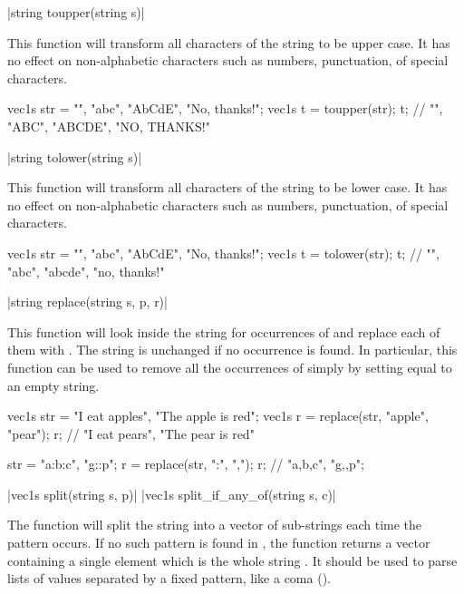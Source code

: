 \funcitem \vectorfunc \cppinline|string toupper(string s)| 

This function will transform all characters of the string to be upper case. It has no effect on non-alphabetic characters such as numbers, punctuation, of special characters.

\begin{example}
\begin{cppcode}
vec1s str = {"", "abc", "AbCdE", "No, thanks!"};
vec1s t = toupper(str);
t; // {"", "ABC", "ABCDE", "NO, THANKS!"}
\end{cppcode}
\end{example}

\funcitem \vectorfunc \cppinline|string tolower(string s)| 

This function will transform all characters of the string to be lower case. It has no effect on non-alphabetic characters such as numbers, punctuation, of special characters.

\begin{example}
\begin{cppcode}
vec1s str = {"", "abc", "AbCdE", "No, thanks!"};
vec1s t = tolower(str);
t; // {"", "abc", "abcde", "no, thanks!"}
\end{cppcode}
\end{example}

\funcitem \vectorfunc \cppinline|string replace(string s, p, r)| 

This function will look inside the string  for occurrences of  and replace each of them with . The string is unchanged if no occurrence is found. In particular, this function can be used to remove all the occurrences of  simply by setting  equal to an empty string.

\begin{example}
\begin{cppcode}
vec1s str = {"I eat apples", "The apple is red"};
vec1s r = replace(str, "apple", "pear");
r; // {"I eat pears", "The pear is red"}

str = {"a:b:c", "g::p"};
r = replace(str, ":", ",");
r; // {"a,b,c", "g,,p"};
\end{cppcode}
\end{example}

\funcitem \cppinline|vec1s split(string s, p)| 
\cppinline|vec1s split_if_any_of(string s, c)| 

The  function will split the string  into a vector of sub-strings each time the pattern  occurs. If no such pattern is found in , the function returns a vector containing a single element which is the whole string . It should be used to parse lists of values separated by a fixed pattern, like a coma ().

